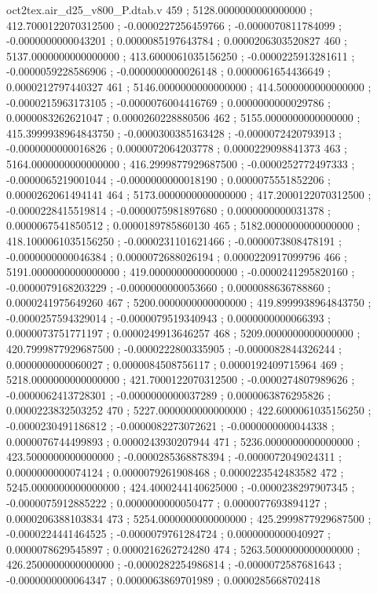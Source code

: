 \begin{filecontents}[overwrite]{oct2tex.air_d25_v800_P.dtab.v}
459 ; 5128.0000000000000000 ; 412.7000122070312500 ; -0.0000227256459766 ; -0.0000070811784099 ; -0.0000000000043201 ; 0.0000085197643784 ; 0.0000206303520827
460 ; 5137.0000000000000000 ; 413.6000061035156250 ; -0.0000225913281611 ; -0.0000059228586906 ; -0.0000000000026148 ; 0.0000061654436649 ; 0.0000212797440327
461 ; 5146.0000000000000000 ; 414.5000000000000000 ; -0.0000215963173105 ; -0.0000076004416769 ; 0.0000000000029786 ; 0.0000083262621047 ; 0.0000260228880506
462 ; 5155.0000000000000000 ; 415.3999938964843750 ; -0.0000300385163428 ; -0.0000072420793913 ; -0.0000000000016826 ; 0.0000072064203778 ; 0.0000229098841373
463 ; 5164.0000000000000000 ; 416.2999877929687500 ; -0.0000252772497333 ; -0.0000065219001044 ; -0.0000000000018190 ; 0.0000075551852206 ; 0.0000262061494141
464 ; 5173.0000000000000000 ; 417.2000122070312500 ; -0.0000228415519814 ; -0.0000075981897680 ; 0.0000000000031378 ; 0.0000067541850512 ; 0.0000189785860130
465 ; 5182.0000000000000000 ; 418.1000061035156250 ; -0.0000231101621466 ; -0.0000073808478191 ; -0.0000000000046384 ; 0.0000072688026194 ; 0.0000220917099796
466 ; 5191.0000000000000000 ; 419.0000000000000000 ; -0.0000241295820160 ; -0.0000079168203229 ; -0.0000000000053660 ; 0.0000088636788860 ; 0.0000241975649260
467 ; 5200.0000000000000000 ; 419.8999938964843750 ; -0.0000257594329014 ; -0.0000079519340943 ; 0.0000000000066393 ; 0.0000073751771197 ; 0.0000249913646257
468 ; 5209.0000000000000000 ; 420.7999877929687500 ; -0.0000222800335905 ; -0.0000082844326244 ; 0.0000000000060027 ; 0.0000084508756117 ; 0.0000192409715964
469 ; 5218.0000000000000000 ; 421.7000122070312500 ; -0.0000274807989626 ; -0.0000062413728301 ; -0.0000000000037289 ; 0.0000063876295826 ; 0.0000223832503252
470 ; 5227.0000000000000000 ; 422.6000061035156250 ; -0.0000230491186812 ; -0.0000082273072621 ; -0.0000000000044338 ; 0.0000076744499893 ; 0.0000243930207944
471 ; 5236.0000000000000000 ; 423.5000000000000000 ; -0.0000285368878394 ; -0.0000072049024311 ; 0.0000000000074124 ; 0.0000079261908468 ; 0.0000223542483582
472 ; 5245.0000000000000000 ; 424.4000244140625000 ; -0.0000238297907345 ; -0.0000075912885222 ; 0.0000000000050477 ; 0.0000077693894127 ; 0.0000206388103834
473 ; 5254.0000000000000000 ; 425.2999877929687500 ; -0.0000224441464525 ; -0.0000079761284724 ; 0.0000000000040927 ; 0.0000078629545897 ; 0.0000216262724280
474 ; 5263.5000000000000000 ; 426.2500000000000000 ; -0.0000282254986814 ; -0.0000072587681643 ; -0.0000000000064347 ; 0.0000063869701989 ; 0.0000285668702418
\end{filecontents}
